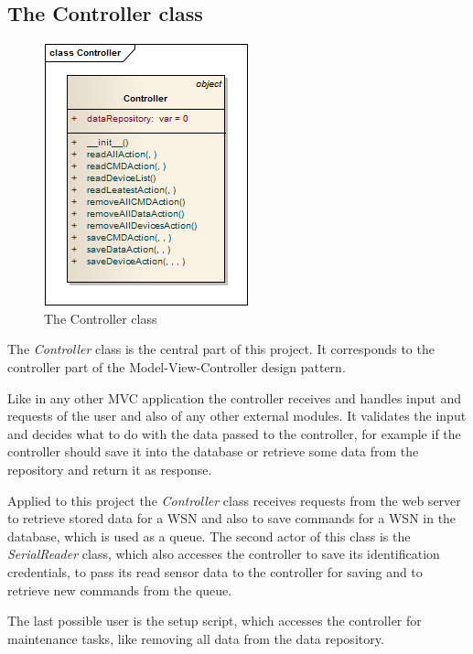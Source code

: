 \subsection{The Controller class}
\begin{figure}[H]
   \centering
   \includegraphics[scale=1]{pic/Controller.png}%
   \caption{The Controller class}
   \label{Controllerpic}%
\end{figure}

The \textit{Controller} class is the central part of this project. It corresponds to the controller part of the Model-View-Controller design pattern.

Like in any other MVC application the controller receives and handles input and requests of the user and also of any other external modules. 
It validates the input and decides what to do with the data passed to the controller, 
for example if the controller should save it into the database or retrieve some data from the repository and return it as response.

Applied to this project the \textit{Controller} class receives requests from the web server to retrieve stored data for a 
WSN and also to save commands for a WSN in the database, which is used as a queue. The second actor of this class is the 
\textit{SerialReader} class, which also accesses the controller to save its identification credentials, 
to pass its read sensor data to the controller for saving and to retrieve new commands from the queue.

The last possible user is the setup script, which accesses the controller for maintenance tasks, like removing all data from the data repository.



\newpage
